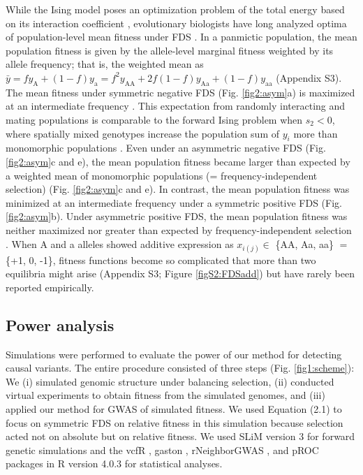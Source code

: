 \documentclass[12pt,]{article}
\begin{document}
While the Ising model poses an optimization problem of the total energy based on its interaction coefficient \citep{cipra1987introduction, anderson1991two, prugel1997dynamics}, evolutionary biologists have long analyzed optima of population-level mean fitness under FDS \citep{cockerham1972frequency,schneider_maximization_2008,takahashi2018balanced}. In a panmictic population, the mean population fitness is given by the allele-level marginal fitness weighted by its allele frequency; that is, the weighted mean as $\bar{y} = f y_\mathrm{A} + (1-f)y_\mathrm{a} = f^2 y_\mathrm{AA} + 2f (1-f)y_\mathrm{Aa} + (1-f)y_\mathrm{aa}$ (Appendix S3). The mean fitness under symmetric negative FDS (Fig. \ref{fig2:asym}a) is maximized at an intermediate frequency \citep{schneider_maximization_2008}. This expectation from randomly interacting and mating populations is comparable to the forward Ising problem when $s_2<0$, where spatially mixed genotypes increase the population sum of $y_i$ more than monomorphic populations \citep{sato2019neighbor}. Even under an asymmetric negative FDS (Fig. \ref{fig2:asym}c and e), the mean population fitness became larger than expected by a weighted mean of monomorphic populations (= frequency-independent selection) \citep{takahashi2018balanced} (Fig. \ref{fig2:asym}c and e). In contrast, the mean population fitness was minimized at an intermediate frequency under a symmetric positive FDS (Fig. \ref{fig2:asym}b). Under asymmetric positive FDS, the mean population fitness was neither maximized nor greater than expected by frequency-independent selection \citep{schneider_maximization_2008, takahashi2018balanced}. When A and a alleles showed additive expression as $x_{i(j)} \in$ \{AA, Aa, aa\} $=$ \{+1, 0, -1\}, fitness functions become so complicated that more than two equilibria might arise (Appendix S3; Figure \ref{figS2:FDSadd}) but have rarely been reported empirically. 

\subsection{Power analysis}
Simulations were performed to evaluate the power of our method for detecting causal variants. The entire procedure consisted of three steps (Fig. \ref{fig1:scheme}): We (i) simulated genomic structure under balancing selection, (ii) conducted virtual experiments to obtain fitness from the simulated genomes, and (iii) applied our method for GWAS of simulated fitness. We used Equation (2.1) to focus on symmetric FDS on relative fitness in this simulation because selection acted not on absolute but on relative fitness. We used SLiM version 3 \citep{haller_slim_2019} for forward genetic simulations and the vcfR \citep{knaus2017vcfr}, gaston \citep{R_gaston}, rNeighborGWAS \citep{sato2019neighbor}, and pROC \citep{R_pROC} packages in R version 4.0.3 \citep{R_citation} for statistical analyses.
\end{document}
